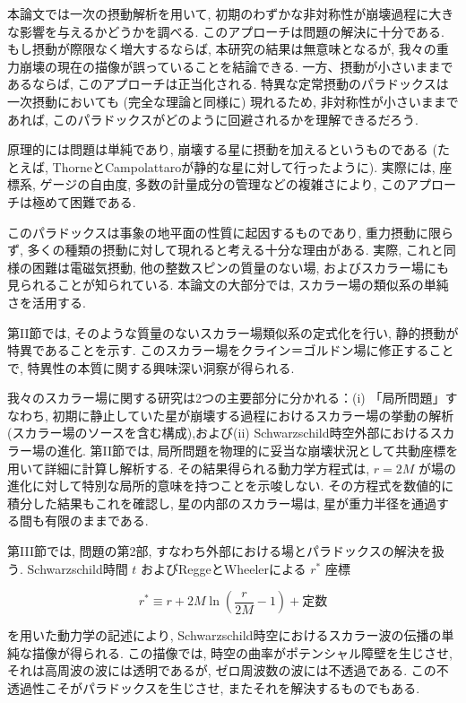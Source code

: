 \documentclass[a4paper,12pt]{article}
\begin{document}
本論文では一次の摂動解析を用いて, 初期のわずかな非対称性が崩壊過程に大きな影響を与えるかどうかを調べる. このアプローチは問題の解決に十分である. もし摂動が際限なく増大するならば, 本研究の結果は無意味となるが, 我々の重力崩壊の現在の描像が誤っていることを結論できる. 一方、摂動が小さいままであるならば, このアプローチは正当化される. 特異な定常摂動のパラドックスは一次摂動においても (完全な理論と同様に) 現れるため, 非対称性が小さいままであれば, このパラドックスがどのように回避されるかを理解できるだろう.

原理的には問題は単純であり, 崩壊する星に摂動を加えるというものである (たとえば, ThorneとCampolattaroが静的な星に対して行ったように). 実際には, 座標系, ゲージの自由度, 多数の計量成分の管理などの複雑さにより, このアプローチは極めて困難である. 

このパラドックスは事象の地平面の性質に起因するものであり, 重力摂動に限らず, 多くの種類の摂動に対して現れると考える十分な理由がある. 実際, これと同様の困難は電磁気摂動, 他の整数スピンの質量のない場, およびスカラー場にも見られることが知られている. 本論文の大部分では, スカラー場の類似系の単純さを活用する.

第II節では, そのような質量のないスカラー場類似系の定式化を行い, 静的摂動が特異であることを示す. このスカラー場をクライン＝ゴルドン場に修正することで, 特異性の本質に関する興味深い洞察が得られる.

我々のスカラー場に関する研究は2つの主要部分に分かれる：(i) 「局所問題」すなわち, 初期に静止していた星が崩壊する過程におけるスカラー場の挙動の解析 (スカラー場のソースを含む構成),および(ii) Schwarzschild時空外部におけるスカラー場の進化. 第II節では, 局所問題を物理的に妥当な崩壊状況として共動座標を用いて詳細に計算し解析する. その結果得られる動力学方程式は, $r = 2M$ が場の進化に対して特別な局所的意味を持つことを示唆しない. その方程式を数値的に積分した結果もこれを確認し, 星の内部のスカラー場は, 星が重力半径を通過する間も有限のままである. 

第III節では, 問題の第2部, すなわち外部における場とパラドックスの解決を扱う. Schwarzschild時間 $t$ およびReggeとWheelerによる $r^\ast$ 座標

\begin{equation*}
    r^\ast \equiv r + 2M \ln\left(\frac{r}{2M} - 1\right) + \text{定数}
\end{equation*}

を用いた動力学の記述により, Schwarzschild時空におけるスカラー波の伝播の単純な描像が得られる. この描像では, 時空の曲率がポテンシャル障壁を生じさせ, それは高周波の波には透明であるが, ゼロ周波数の波には不透過である. この不透過性こそがパラドックスを生じさせ, またそれを解決するものでもある.
\end{document}
